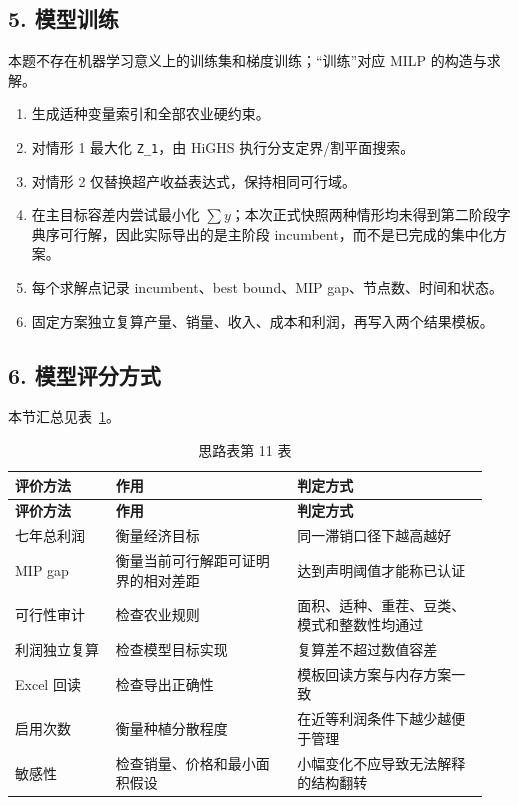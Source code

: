 \documentclass[UTF8,11pt,a4paper]{ctexart}
\begin{document}
\subsection{5. 模型训练}

本题不存在机器学习意义上的训练集和梯度训练；“训练”对应 MILP 的构造与求解。

\begin{enumerate}
\item 生成适种变量索引和全部农业硬约束。
\item 对情形 1 最大化 \texttt{Z\_1}，由 HiGHS 执行分支定界/割平面搜索。
\item 对情形 2 仅替换超产收益表达式，保持相同可行域。
\item 在主目标容差内尝试最小化 \(\sum{}y\)；本次正式快照两种情形均未得到第二阶段字典序可行解，因此实际导出的是主阶段 incumbent，而不是已完成的集中化方案。
\item 每个求解点记录 incumbent、best bound、MIP gap、节点数、时间和状态。
\item 固定方案独立复算产量、销量、收入、成本和利润，再写入两个结果模板。
\end{enumerate}

\subsection{6. 模型评分方式}

\noindent 本节汇总见表~\ref{tab:thought-11}。
\begin{longtable}{@{}>{\raggedright\arraybackslash}p{0.20\linewidth}>{\raggedright\arraybackslash}p{0.36\linewidth}>{\raggedright\arraybackslash}p{0.38\linewidth}@{}}
\caption{思路表第 11 表}\label{tab:thought-11}\\
\toprule
\textbf{评价方法} & \textbf{作用} & \textbf{判定方式} \\
\midrule
\endfirsthead
\toprule
\textbf{评价方法} & \textbf{作用} & \textbf{判定方式} \\
\midrule
\endhead
七年总利润 & 衡量经济目标 & 同一滞销口径下越高越好 \\
MIP gap & 衡量当前可行解距可证明界的相对差距 & 达到声明阈值才能称已认证 \\
可行性审计 & 检查农业规则 & 面积、适种、重茬、豆类、模式和整数性均通过 \\
利润独立复算 & 检查模型目标实现 & 复算差不超过数值容差 \\
Excel 回读 & 检查导出正确性 & 模板回读方案与内存方案一致 \\
启用次数 & 衡量种植分散程度 & 在近等利润条件下越少越便于管理 \\
敏感性 & 检查销量、价格和最小面积假设 & 小幅变化不应导致无法解释的结构翻转 \\
\bottomrule
\end{longtable}
\end{document}

